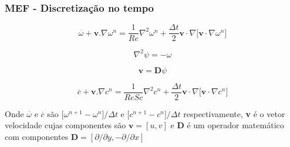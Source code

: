 
\begin{frame} 
 \frametitle{\Large MEF - Discretização no tempo}
\vspace{-1cm}
\small
\begin{equation*}
\overset{.}{\omega} + \textbf{v}.\nabla \omega^n = \frac{1}{Re} \nabla^2 \omega^n 
 + \frac{\Delta t}{2} \textbf{v} \cdot \nabla \big[ \textbf{v} \cdot \nabla \omega^n \big]
\end{equation*}

\vspace{0.3cm}
\begin{equation*}
\nabla^2 \psi = - \omega
\end{equation*}

\vspace{0.3cm}
\begin{equation*}
\textbf{v} = \textbf{D}\psi
\end{equation*}

\vspace{0.3cm}
\begin{equation*}
\overset{.}{c} + \textbf{v}.\nabla c^n = \frac{1}{ReSc} \nabla^2 c^n
 + \frac{\Delta t}{2} \textbf{v} \cdot \nabla \big[ \textbf{v} \cdot \nabla c^n \big]
\end{equation*}

\scriptsize
\vspace{1cm}
Onde $\overset{.}{\omega}$ e
$\overset{.}{c}$ são
$\big[ \omega^{n+1}-\omega^{n} \big] /\Delta t$ e
$\big[ c^{n+1}-c^{n} \big] /\Delta t$ respectivamente,
\textbf{v} é o vetor velocidade cujas componentes são
$ \textbf{v} = [u,v]$
e \textbf{D} é um operador matemático com componentes
$ \textbf{D} = [\partial/\partial y, -\partial/\partial x]$

\end{frame}


